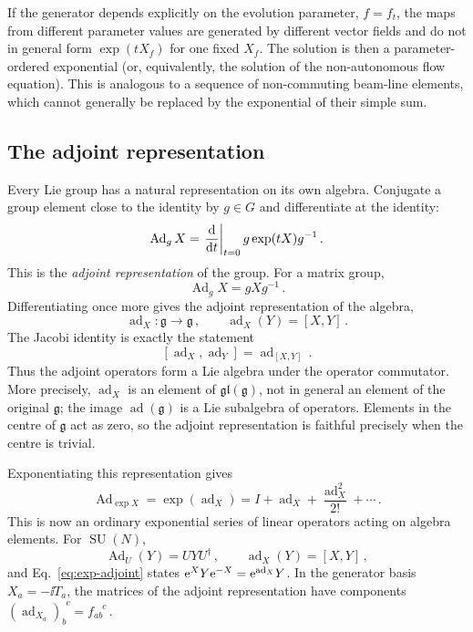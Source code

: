 If the generator depends explicitly on the evolution parameter,
$f = f_t$, the maps from different parameter values are generated by different
vector fields and do not in general form $\exp(tX_f)$ for one fixed $X_f$.
The solution is then a parameter-ordered exponential (or, equivalently, the
solution of the non-autonomous flow equation).  This is analogous to a
sequence of non-commuting beam-line elements, which cannot generally be
replaced by the exponential of their simple sum.


\subsection{The adjoint representation}

Every Lie group has a natural representation on its own algebra.  Conjugate
a group element close to the identity by $g\in G$ and differentiate at the
identity:
\begin{equation}
    \operatorname{Ad}_gX = \left.\frac{\text{d} {}}{\text{d} {t}}\right|_{t = 0}
    g\exp(tX)g^{-1}\,.
\end{equation}
This is the \emph{adjoint representation} of the group.  For a matrix group,
\begin{equation}
    \operatorname{Ad}_gX = gXg^{-1}\,.
\end{equation}
Differentiating once more gives the adjoint representation of the algebra,
\begin{equation}\label{eq:adjoint-algebra}
    \operatorname{ad}_X:\mathfrak{g}\longrightarrow\mathfrak{g}\,,
    \qquad \operatorname{ad}_X(Y) = [X,Y]\,.
\end{equation}
The Jacobi identity is exactly the statement
\begin{equation}\label{eq:ad-commutator}
    [\operatorname{ad}_X,\operatorname{ad}_Y] = \operatorname{ad}_{[X,Y]}\,.
\end{equation}
Thus the adjoint operators form a Lie algebra under the operator commutator.
More precisely, $\operatorname{ad}_X$ is an element of
$\mathfrak{gl}(\mathfrak{g})$, not in general an element of the original
$\mathfrak{g}$; the image $\operatorname{ad}(\mathfrak{g})$ is a Lie
subalgebra of operators.  Elements in the centre of $\mathfrak{g}$ act as
zero, so the adjoint representation is faithful precisely when the centre is
trivial.

Exponentiating this representation gives
\begin{equation}\label{eq:exp-adjoint}
    \operatorname{Ad}_{\exp X} = \exp(\operatorname{ad}_X)
    = I + \operatorname{ad}_X + \frac{\operatorname{ad}_X^2}{2!} + \cdots\,.
\end{equation}
This is now an ordinary exponential series of linear operators acting on
algebra elements.  For $\operatorname{SU}(N)$,
\begin{equation}
    \operatorname{Ad}_U(Y) = UYU^\dagger\,,
    \qquad \operatorname{ad}_X(Y) = [X,Y]\,,
\end{equation}
and Eq.~\eqref{eq:exp-adjoint} states
$\mathrm{e}^XY\mathrm{e}^{-X} = \mathrm{e}^{\operatorname{ad}_X}Y$.
In the generator basis $X_a = -\ii T_a$, the matrices of the adjoint
representation have components
$(\operatorname{ad}_{X_a})_b^{\phantom{b}c} = f_{ab}^{\phantom{ab}c}$\,.


